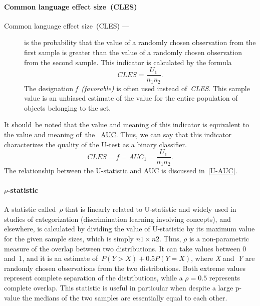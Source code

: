 \documentclass[]{scrreprt}
\begin{document}
\paragraph{Common language effect size~(CLES)}
\begin{description}
	\item[Common language effect size~(CLES) ---] is the probability that the value of a randomly chosen observation from the first sample is greater than the value of a randomly chosen observation from the second sample. This indicator is calculated by the formula
	\begin{equation}\label{eq:CLES}
	CLES = \frac{U_{1}}{n_{1}n_{2}}.
	\end{equation}
	The designation \emph{f~(favorable)} is often used instead of~\emph{CLES}. This sample value is an unbiased estimate of the value for the entire population of objects belonging to the set.	
\end{description}
It should~be noted that the value and meaning of this indicator is equivalent to the value and meaning of~the ~\href{https://en.wikipedia.org/wiki/Receiver_operating_characteristic}{AUC}\cite{Wiki:ROC}. Thus, we can say that this indicator characterizes the quality of the U-test as a binary classifier.
\begin{equation}\label{eq:AUC}
CLES = f = AUC_{1} = \frac{U_{1}}{n_{1}n_{2}}.
\end{equation}
The relationship between the U-statistic and AUC is discussed in~\ref{U-AUC}.
%
\paragraph{$\rho$-statistic}
A statistic called~$\rho$ that is linearly related to U-statistic and widely used in studies of categorization (discrimination learning involving concepts), and elsewhere, is calculated by dividing the value of U-statistic by its maximum value for the given sample sizes, which is simply $n1 \times n2$. Thus, $\rho$ is a non-parametric measure of the overlap between two distributions. It can take values between 0 and~1, and it is an estimate of~$P(Y > X) + 0.5 P(Y = X)$, where \textit{X} and~\textit{Y} are randomly chosen observations from the two distributions. Both extreme values represent complete separation of the distributions, while a $ρ = 0.5$ represents complete overlap. This statistic is useful in particular when despite a large p-value the medians of the two samples are essentially equal to each other. 
%
\end{document}

